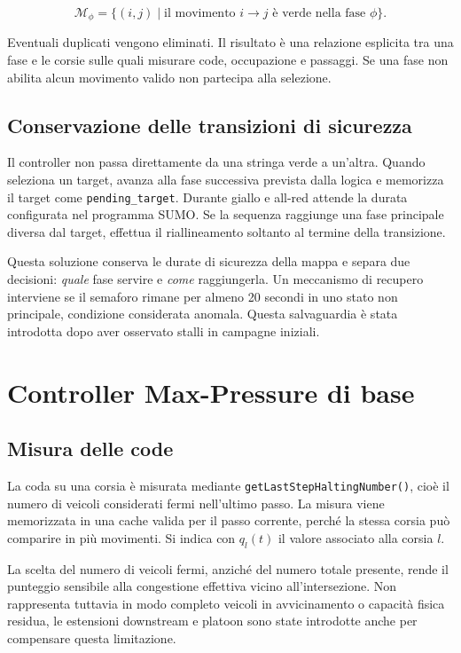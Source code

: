\documentclass[12pt,a4paper,oneside]{report}
\numberwithin{equation}{chapter}
\begin{document}
\begin{equation}
    \mathcal{M}_\phi=\{(i,j)\mid \text{il movimento }i\rightarrow j
    \text{ è verde nella fase }\phi\}.
\end{equation}

Eventuali duplicati vengono eliminati. Il risultato è una relazione esplicita
tra una fase e le corsie sulle quali misurare code, occupazione e passaggi. Se
una fase non abilita alcun movimento valido non partecipa alla selezione.

\subsection{Conservazione delle transizioni di sicurezza}

Il controller non passa direttamente da una stringa verde a un'altra. Quando
seleziona un target, avanza alla fase successiva prevista dalla logica e
memorizza il target come \texttt{pending\_target}. Durante giallo e all-red
attende la durata configurata nel programma SUMO. Se la sequenza raggiunge una
fase principale diversa dal target, effettua il riallineamento soltanto al
termine della transizione.

Questa soluzione conserva le durate di sicurezza della mappa e separa due
decisioni: \emph{quale} fase servire e \emph{come} raggiungerla. Un meccanismo
di recupero interviene se il semaforo rimane per almeno 20 secondi in uno stato
non principale, condizione considerata anomala. Questa salvaguardia è stata
introdotta dopo aver osservato stalli in campagne iniziali.

\section{Controller Max-Pressure di base}

\subsection{Misura delle code}

La coda su una corsia è misurata mediante
\texttt{getLastStepHaltingNumber()}, cioè il numero di veicoli considerati
fermi nell'ultimo passo. La misura viene memorizzata in una cache valida per il
passo corrente, perché la stessa corsia può comparire in più movimenti. Si
indica con $q_l(t)$ il valore associato alla corsia $l$.

La scelta del numero di veicoli fermi, anziché del numero totale presente,
rende il punteggio sensibile alla congestione effettiva vicino
all'intersezione. Non rappresenta tuttavia in modo completo veicoli in
avvicinamento o capacità fisica residua, le estensioni downstream e platoon
sono state introdotte anche per compensare questa limitazione.
\end{document}
